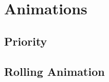 \chapter{Animations}
\label{cha:animations}

\section{Priority}
\label{sec:anim-pri}


\section{Rolling Animation}
\label{sec:rolling-anim}

